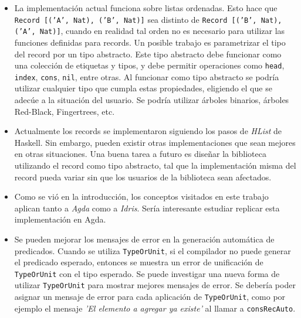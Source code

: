 \begin{itemize}
\item La implementación actual funciona sobre listas ordenadas. Esto hace que \texttt{Record [('A', Nat), ('B', Nat)]} sea distinto de \texttt{Record [('B', Nat), ('A', Nat)]}, cuando en realidad tal orden no es necesario para utilizar las funciones definidas para records. Un posible trabajo es parametrizar el tipo del record por un tipo abstracto. Este tipo abstracto debe funcionar como una colección de etiquetas y tipos, y debe permitir operaciones como \texttt{head}, \texttt{index}, \texttt{cons}, \texttt{nil}, entre otras. Al funcionar como tipo abstracto se podría utilizar cualquier tipo que cumpla estas propiedades, eligiendo el que se adecúe a la situación del usuario. Se podría utilizar árboles binarios, árboles Red-Black, Fingertrees, etc.

\item Actualmente los records se implementaron siguiendo los pasos de \textit{HList} de Haskell. Sin embargo, pueden existir otras implementaciones que sean mejores en otras situaciones. Una buena tarea a futuro es diseñar la biblioteca utilizando el record como tipo abstracto, tal que la implementación misma del record pueda variar sin que los usuarios de la biblioteca sean afectados.

\item Como se vió en la introducción, los conceptos visitados en este trabajo aplican tanto a \textit{Agda} como a \textit{Idris}. Sería interesante estudiar replicar esta implementación en Agda.

\item Se pueden mejorar los mensajes de error en la generación automática de predicados. Cuando se utiliza \texttt{TypeOrUnit}, si el compilador no puede generar el predicado esperado, entonces se muestra un error de unificación de \texttt{TypeOrUnit} con el tipo esperado. Se puede investigar una nueva forma de utilizar \texttt{TypeOrUnit} para mostrar mejores mensajes de error. Se debería poder asignar un mensaje de error para cada aplicación de \texttt{TypeOrUnit}, como por ejemplo el mensaje \textit{'El elemento a agregar ya existe'} al llamar a \texttt{consRecAuto}.
\end{itemize}
